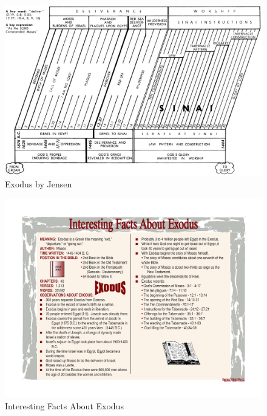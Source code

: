 \newpage
\begin{figure}
\begin{center}
\includegraphics[scale=1.7, angle=90]{02OT-Exodus/References/Jensen-Exodus.png}
\caption[Exodus by Jensen]{Exodus by Jensen}
\label{fig:Exodus by Jensen}
\end{center}
\end{figure}

\newpage
\begin{figure}
\begin{center}
\includegraphics[scale=0.6, angle=90]{02OT-Exodus/References/interestingfactsaboutexodus.pdf}
\caption[Interesting Facts About Exodus]{Interesting Facts About Exodus}
\label{fig:Interesting Facts About Exodus}
\end{center}
\end{figure}



